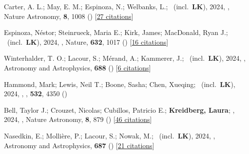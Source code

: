 \item[{\color{numcolor}\scriptsize120}] Carter, A. L.; May, E. M.; Espinoza, N.; Welbanks, L.; \etal\ (incl.\ \textbf{LK}), 2024, , Nature Astronomy, \textbf{8}, 1008 () [\href{https://ui.adsabs.harvard.edu/abs/2024NatAs...8.1008C}{27 citations}]

\item[{\color{numcolor}\scriptsize119}] Espinoza, N{\'e}stor; Steinrueck, Maria E.; Kirk, James; MacDonald, Ryan J.; \etal\ (incl.\ \textbf{LK}), 2024, , Nature, \textbf{632}, 1017 () [\href{https://ui.adsabs.harvard.edu/abs/2024Natur.632.1017E}{16 citations}]

\item[{\color{numcolor}\scriptsize118}] Winterhalder, T. O.; Lacour, S.; M{\'e}rand, A.; Kammerer, J.; \etal\ (incl.\ \textbf{LK}), 2024, , Astronomy and Astrophysics, \textbf{688} () [\href{https://ui.adsabs.harvard.edu/abs/2024A&A...688A..44W}{6 citations}]

\item[{\color{numcolor}\scriptsize117}] Hammond, Mark; Lewis, Neil T.; Boone, Sasha; Chen, Xueqing; \etal\ (incl.\ \textbf{LK}), 2024, , \mnras, \textbf{532}, 4350 ()

\item[{\color{numcolor}\scriptsize116}] Bell, Taylor J.; Crouzet, Nicolas; Cubillos, Patricio E.; \textbf{Kreidberg, Laura}; \etal, 2024, , Nature Astronomy, \textbf{8}, 879 () [\href{https://ui.adsabs.harvard.edu/abs/2024NatAs...8..879B}{46 citations}]

\item[{\color{numcolor}\scriptsize115}] Nasedkin, E.; Molli{\`e}re, P.; Lacour, S.; Nowak, M.; \etal\ (incl.\ \textbf{LK}), 2024, , Astronomy and Astrophysics, \textbf{687} () [\href{https://ui.adsabs.harvard.edu/abs/2024A&A...687A.298N}{21 citations}]

